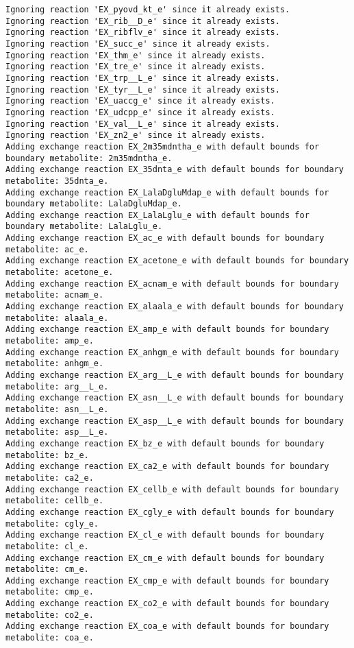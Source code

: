 \documentclass[
  letterpaper,
  DIV=11,
  numbers=noendperiod]{scrartcl}
\begin{document}
\begin{verbatim}
Ignoring reaction 'EX_pyovd_kt_e' since it already exists.
Ignoring reaction 'EX_rib__D_e' since it already exists.
Ignoring reaction 'EX_ribflv_e' since it already exists.
Ignoring reaction 'EX_succ_e' since it already exists.
Ignoring reaction 'EX_thm_e' since it already exists.
Ignoring reaction 'EX_tre_e' since it already exists.
Ignoring reaction 'EX_trp__L_e' since it already exists.
Ignoring reaction 'EX_tyr__L_e' since it already exists.
Ignoring reaction 'EX_uaccg_e' since it already exists.
Ignoring reaction 'EX_udcpp_e' since it already exists.
Ignoring reaction 'EX_val__L_e' since it already exists.
Ignoring reaction 'EX_zn2_e' since it already exists.
Adding exchange reaction EX_2m35mdntha_e with default bounds for boundary metabolite: 2m35mdntha_e.
Adding exchange reaction EX_35dnta_e with default bounds for boundary metabolite: 35dnta_e.
Adding exchange reaction EX_LalaDgluMdap_e with default bounds for boundary metabolite: LalaDgluMdap_e.
Adding exchange reaction EX_LalaLglu_e with default bounds for boundary metabolite: LalaLglu_e.
Adding exchange reaction EX_ac_e with default bounds for boundary metabolite: ac_e.
Adding exchange reaction EX_acetone_e with default bounds for boundary metabolite: acetone_e.
Adding exchange reaction EX_acnam_e with default bounds for boundary metabolite: acnam_e.
Adding exchange reaction EX_alaala_e with default bounds for boundary metabolite: alaala_e.
Adding exchange reaction EX_amp_e with default bounds for boundary metabolite: amp_e.
Adding exchange reaction EX_anhgm_e with default bounds for boundary metabolite: anhgm_e.
Adding exchange reaction EX_arg__L_e with default bounds for boundary metabolite: arg__L_e.
Adding exchange reaction EX_asn__L_e with default bounds for boundary metabolite: asn__L_e.
Adding exchange reaction EX_asp__L_e with default bounds for boundary metabolite: asp__L_e.
Adding exchange reaction EX_bz_e with default bounds for boundary metabolite: bz_e.
Adding exchange reaction EX_ca2_e with default bounds for boundary metabolite: ca2_e.
Adding exchange reaction EX_cellb_e with default bounds for boundary metabolite: cellb_e.
Adding exchange reaction EX_cgly_e with default bounds for boundary metabolite: cgly_e.
Adding exchange reaction EX_cl_e with default bounds for boundary metabolite: cl_e.
Adding exchange reaction EX_cm_e with default bounds for boundary metabolite: cm_e.
Adding exchange reaction EX_cmp_e with default bounds for boundary metabolite: cmp_e.
Adding exchange reaction EX_co2_e with default bounds for boundary metabolite: co2_e.
Adding exchange reaction EX_coa_e with default bounds for boundary metabolite: coa_e.

\end{verbatim}
\end{document}
